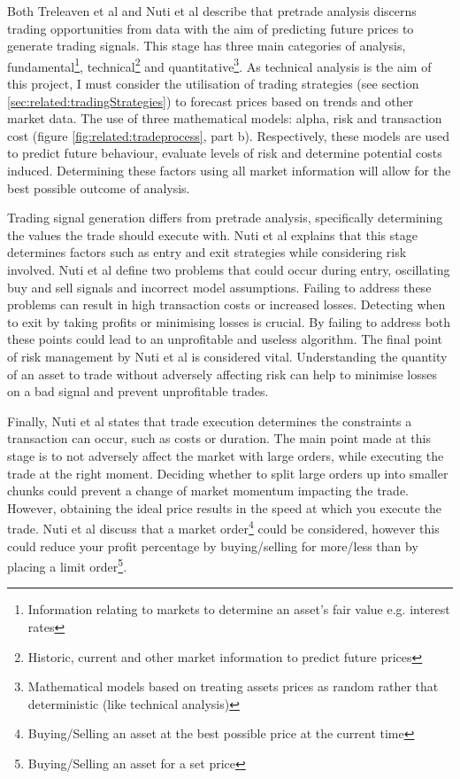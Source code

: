 Both Treleaven et al \cite{ART:Treleaven:2013} and Nuti et al \cite{ART:Nuti:2011} describe that pretrade analysis discerns trading opportunities from data with the aim of predicting future prices to generate trading signals. This stage has three main categories of analysis, fundamental\footnote{Information relating to markets to determine an asset's fair value e.g. interest rates}, technical\footnote{Historic, current and other market information to predict future prices} and quantitative\footnote{Mathematical models based on treating assets prices as random rather that deterministic (like technical analysis)}. As technical analysis is the aim of this project, I must consider the utilisation of trading strategies (see section \ref{sec:related:tradingStrategies}) to forecast prices based on trends and other market data. The use of three mathematical models: alpha, risk and transaction cost (figure \ref{fig:related:tradeprocess}, part b). Respectively, these models are used to predict future behaviour, evaluate levels of risk and determine potential costs induced. Determining these factors using all market information will allow for the best possible outcome of analysis. 

Trading signal generation differs from pretrade analysis, specifically determining the values the trade should execute with. Nuti et al \cite{ART:Nuti:2011} explains that this stage determines factors such as entry and exit strategies while considering risk involved. Nuti et al define two problems that could occur during entry, oscillating buy and sell signals and incorrect model assumptions. Failing to address these problems can result in high transaction costs or increased losses. Detecting when to exit by taking profits or minimising losses is crucial. By failing to address both these points could lead to an unprofitable and useless algorithm. The final point of risk management by Nuti et al is considered vital. Understanding the quantity of an asset to trade without adversely affecting risk can help to minimise losses on a bad signal and prevent unprofitable trades.

Finally, Nuti et al \cite{ART:Nuti:2011} states that trade execution determines the constraints a transaction can occur, such as costs or duration. The main point made at this stage is to not adversely affect the market with large orders, while executing the trade at the right moment. Deciding whether to split large orders up into smaller chunks could prevent a change of market momentum impacting the trade. However, obtaining the ideal price results in the speed at which you execute the trade. Nuti et al discuss that a market order\footnote{Buying/Selling an asset at the best possible price at the current time} could be considered, however this could reduce your profit percentage by buying/selling for more/less than by placing a limit order\footnote{Buying/Selling an asset for a set price}.

